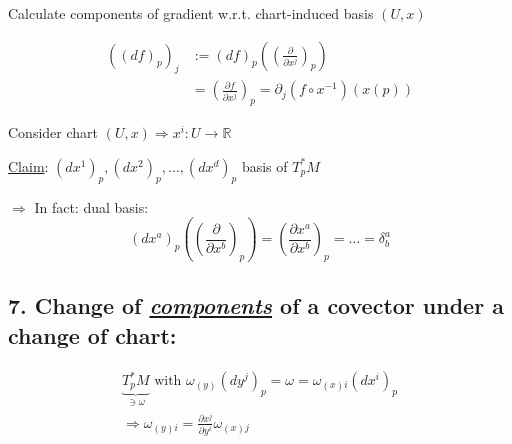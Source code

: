Calculate components of gradient w.r.t. chart-induced basis $(U,x)$  

\[
\begin{aligned}
  \left( (df)_p \right)_j & := (df)_p\left( \left( \frac{ \partial }{ \partial x^j} \right)_p \right) \\
  & = \left( \frac{ \partial f}{ \partial x^j } \right)_p = \partial_j (f\circ x^{-1} )(x(p))
\end{aligned}
\]

\begin{theorem}
  Consider chart $(U,x)  \Longrightarrow x^i : U \to \mathbb{R}$  

\underline{Claim}: $(d x^1)_p, (dx^2)_p, \dots , (dx^d)_p$ basis of $T_p^*M$ 

$\Longrightarrow $ In fact: dual basis: 
\[
(dx^a)_p \left( \left( \frac{ \partial }{ \partial x^b} \right)_p \right) = \left( \frac{ \partial x^a}{ \partial x^b} \right)_p = \dots = \delta_b^a
\]
\end{theorem}

\subsection{ 7. Change of \emph{ \underline{components} } of a covector under a change of chart: }

\[
\begin{gathered}
  \underbrace{ T_p^*M }_{ \ni \omega} \text{ with } 
\omega_{(y)} (dy^j)_p =   \omega = \omega_{(x)i} (dx^i)_p  \\
\Longrightarrow \boxed{ \omega_{(y)i} = \frac{ \partial x^j}{ \partial y^i } \omega_{(x)j } }
\end{gathered}
\]

